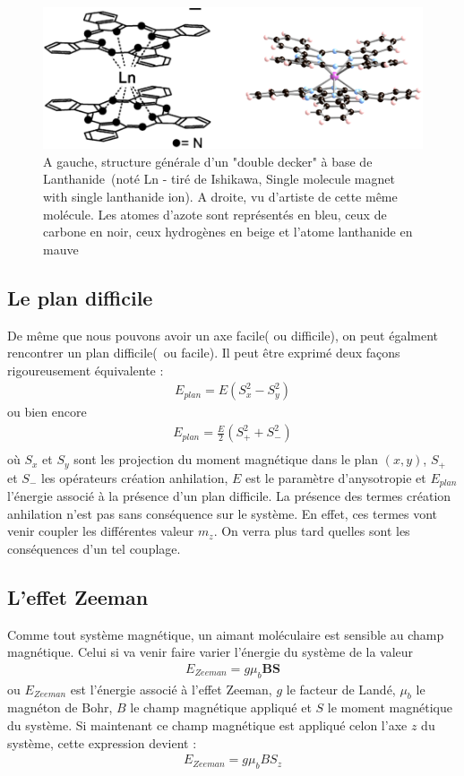 \begin{figure}
\centering \includegraphics[scale=0.3]{Theorie/MagMol/figure2/figure2.png} 
\caption{A gauche, structure générale d'un "double decker" à base de Lanthanide~(noté Ln - tiré de Ishikawa, Single molecule magnet with single lanthanide ion). A droite, vu d'artiste de cette m\^eme molécule. Les atomes d'azote sont représentés en bleu, ceux de carbone en noir, ceux hydrogènes en beige et l'atome lanthanide en mauve}
\label{TbPc2}
\end{figure}

\subsection{Le plan difficile}
De m\^eme que nous pouvons avoir un axe facile( ou difficile), on peut égalment rencontrer un plan difficile(~ou facile). Il peut \^etre exprimé deux façons rigoureusement équivalente :
\begin{eqnarray}
E_{plan} = E ( S_x^2 -S_y^2) \nonumber
\end{eqnarray}
ou bien encore
\begin{eqnarray}
E_{plan} = \frac{E}{2} ( S_+^2  + S_-^2) \nonumber \\
\end{eqnarray}
où $S_x$ et $S_y$ sont les projection du moment magnétique dans le plan $(x,y)$, $S_+$ et $S_-$ les opérateurs création anhilation, $E$ est le paramètre d'anysotropie et $E_{plan}$ l'énergie associé à la présence d'un plan difficile. La présence des termes création anhilation n'est pas sans conséquence sur le système. En effet, ces termes vont venir coupler les différentes valeur $m_z$. On verra plus tard quelles sont les conséquences d'un tel couplage.

\subsection{L'effet Zeeman}
Comme tout système magnétique, un aimant moléculaire est sensible au champ magnétique. Celui si va venir faire varier l'énergie du système de la valeur
\begin{eqnarray}
E_{Zeeman}= g\mu_b \mathbf{BS} \nonumber
\end{eqnarray}
ou $E_{Zeeman}$ est l'énergie associé à l'effet Zeeman, $g$ le facteur de Landé, $\mu_b$ le magnéton de Bohr, $B$ le champ magnétique appliqué et $S$ le moment magnétique du système. Si maintenant ce champ magnétique est appliqué celon l'axe $z$ du système, cette expression devient :
\begin{eqnarray}
E_{Zeeman}= g\mu_b B S_z \nonumber
\end{eqnarray}

